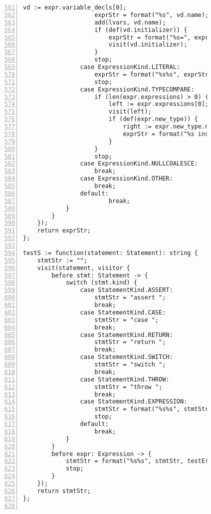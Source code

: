 \begin{figure}[ht!]
\begin{lstlisting}[numbers=left, tabsize=4, escapechar=@, caption={API Usage Mining Analysis},label={lst:aun-code},  firstline = 561, firstnumber = 561, lastline = 621]
                    vd := expr.variable_decls[0];
                    exprStr = format("%s", vd.name);
                    add(lvars, vd.name);
                    if (def(vd.initializer)) {
                        exprStr = format("%s=", exprStr);
                        visit(vd.initializer);
                    }
                    stop;
                case ExpressionKind.LITERAL:
                    exprStr = format("%s%s", exprStr, expr.literal);
                    stop;
                case ExpressionKind.TYPECOMPARE:
                    if (len(expr.expressions) > 0) {
                        left := expr.expressions[0];
                        visit(left);
                        if (def(expr.new_type)) {
                            right := expr.new_type.name;
                            exprStr = format("%s instanceof %s", exprStr, right);
                        }
                    }
                    stop;
                case ExpressionKind.NULLCOALESCE:
                    break;
                case ExpressionKind.OTHER:
                    break;
                default:    
                        break;
            }
        }
    });
    return exprStr;
};

testS := function(statement: Statement): string {
    stmtStr := "";
    visit(statement, visitor {
        before stmt: Statement -> {
            switch (stmt.kind) {
                case StatementKind.ASSERT:
                    stmtStr = "assert ";
                    break;
                case StatementKind.CASE:
                    stmtStr = "case ";
                    break;
                case StatementKind.RETURN:
                    stmtStr = "return ";
                    break;
                case StatementKind.SWITCH:
                    stmtStr = "switch ";
                    break;
                case StatementKind.THROW:
                    stmtStr = "throw ";
                    break;
                case StatementKind.EXPRESSION:
                    stmtStr = format("%s%s", stmtStr, testE(stmt.expression));
                    stop;
                default:    
                    break;
            }
        }
        before expr: Expression -> {
            stmtStr = format("%s%s", stmtStr, testE(expr));    
            stop;
        }
    });
    return stmtStr;
};


\end{lstlisting}
\end{figure}
